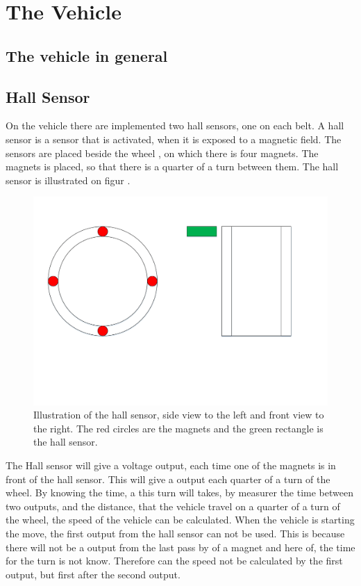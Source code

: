 \section{The Vehicle}

\subsection{The vehicle in general}

\subsection{Hall Sensor}

On the vehicle there are implemented two hall sensors, one on each belt. A hall sensor is a sensor that is activated, when it is exposed to a magnetic field. The sensors are placed beside the wheel , on which there is four magnets. The magnets is placed, so that there is a quarter of a turn between them. The hall sensor is illustrated on figur .

 \begin{figure}[H]
	\centering
	\includegraphics[scale=0.5]{figures/HallSensorSide_Forward_view.pdf}
	\caption{Illustration of the hall sensor, side view to the left and front view to the right. The red circles are the magnets and the green rectangle is the hall sensor.}
	\label{fig:HallSensor}
\end{figure}

The Hall sensor will give a voltage output, each time one of the magnets is in front of the hall sensor. This will give a output each quarter of a turn of the wheel. By knowing the time, a this turn will takes, by measurer the time between two outputs, and the distance, that the vehicle travel on a quarter of a turn of the wheel, the speed of the vehicle can be calculated.
When the vehicle is starting the move, the first output from the hall sensor can not be used. This is because there will not be a output from the last pass by of a magnet and here of, the time for the turn is not know. Therefore can the speed not be calculated by the first output, but first after the second output.

